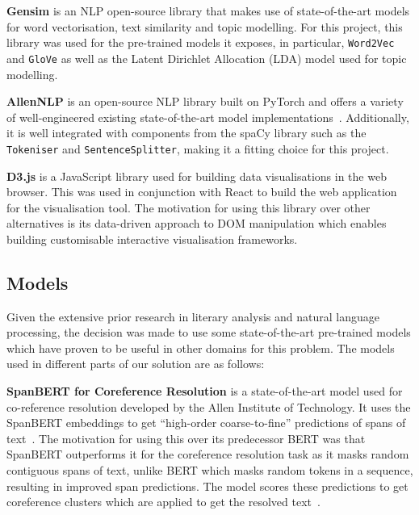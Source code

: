 \textbf{Gensim} is an NLP open-source library that makes use of state-of-the-art models for word vectorisation, text similarity and topic modelling. For this project, this library was used for the pre-trained models it exposes, in particular, \texttt{Word2Vec} and \texttt{GloVe} as well as the Latent Dirichlet Allocation (LDA) model used for topic modelling. 

\textbf{AllenNLP} is an open-source NLP library built on PyTorch and offers a variety of well-engineered existing state-of-the-art model implementations~\cite{allennlp}. Additionally, it is well integrated with components from the spaCy library such as the \texttt{Tokeniser} and \texttt{SentenceSplitter}, making it a fitting choice for this project. 

\textbf{D3.js} is a JavaScript library used for building data visualisations in the web browser. This was used in conjunction with React to build the web application for the visualisation tool. The motivation for using this library over other alternatives is its data-driven approach to DOM manipulation which enables building customisable interactive visualisation frameworks. 


\subsection{Models} \label{s:models}

Given the extensive prior research in literary analysis and natural language processing, the decision was made to use some state-of-the-art pre-trained models which have proven to be useful in other domains for this problem. The models used in different parts of our solution are as follows: 

\textbf{SpanBERT for Coreference Resolution} is a state-of-the-art model used for co-reference resolution developed by the Allen Institute of Technology. It uses the SpanBERT embeddings to get ``high-order coarse-to-fine'' predictions of spans of text~\cite{spanBERT}. The motivation for using this over its predecessor BERT was that SpanBERT outperforms it for the coreference resolution task as it masks random contiguous spans of text, unlike BERT which masks random tokens in a sequence, resulting in improved span predictions. The model scores these predictions to get coreference clusters which are applied to get the resolved text~\cite{spanBERT}.

